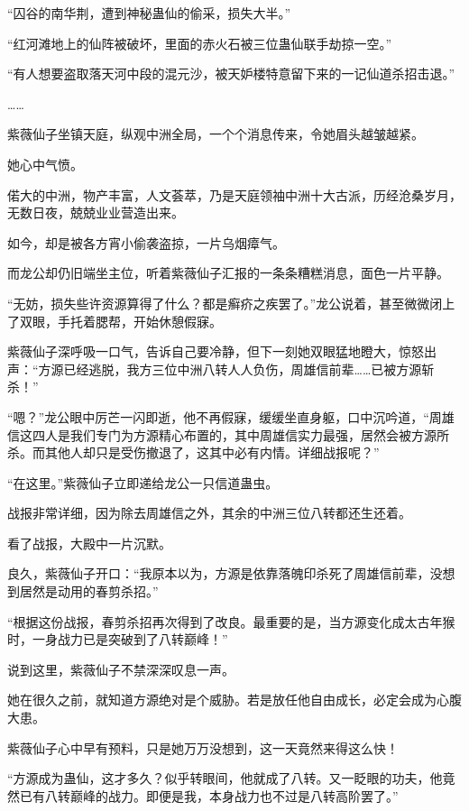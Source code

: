 
\begin{this_body}

“囚谷的南华荆，遭到神秘蛊仙的偷采，损失大半。”

“红河滩地上的仙阵被破坏，里面的赤火石被三位蛊仙联手劫掠一空。”

“有人想要盗取落天河中段的混元沙，被天妒楼特意留下来的一记仙道杀招击退。”

……

紫薇仙子坐镇天庭，纵观中洲全局，一个个消息传来，令她眉头越皱越紧。

她心中气愤。

偌大的中洲，物产丰富，人文荟萃，乃是天庭领袖中洲十大古派，历经沧桑岁月，无数日夜，兢兢业业营造出来。

如今，却是被各方宵小偷袭盗掠，一片乌烟瘴气。

而龙公却仍旧端坐主位，听着紫薇仙子汇报的一条条糟糕消息，面色一片平静。

“无妨，损失些许资源算得了什么？都是癣疥之疾罢了。”龙公说着，甚至微微闭上了双眼，手托着腮帮，开始休憩假寐。

紫薇仙子深呼吸一口气，告诉自己要冷静，但下一刻她双眼猛地瞪大，惊怒出声：“方源已经逃脱，我方三位中洲八转人人负伤，周雄信前辈……已被方源斩杀！”

“嗯？”龙公眼中厉芒一闪即逝，他不再假寐，缓缓坐直身躯，口中沉吟道，“周雄信这四人是我们专门为方源精心布置的，其中周雄信实力最强，居然会被方源所杀。而其他人却只是受伤撤退了，这其中必有内情。详细战报呢？”

“在这里。”紫薇仙子立即递给龙公一只信道蛊虫。

战报非常详细，因为除去周雄信之外，其余的中洲三位八转都还生还着。

看了战报，大殿中一片沉默。

良久，紫薇仙子开口：“我原本以为，方源是依靠落魄印杀死了周雄信前辈，没想到居然是动用的春剪杀招。”

“根据这份战报，春剪杀招再次得到了改良。最重要的是，当方源变化成太古年猴时，一身战力已是突破到了八转巅峰！”

说到这里，紫薇仙子不禁深深叹息一声。

她在很久之前，就知道方源绝对是个威胁。若是放任他自由成长，必定会成为心腹大患。

紫薇仙子心中早有预料，只是她万万没想到，这一天竟然来得这么快！

“方源成为蛊仙，这才多久？似乎转眼间，他就成了八转。又一眨眼的功夫，他竟然已有八转巅峰的战力。即便是我，本身战力也不过是八转高阶罢了。”


\end{this_body}
